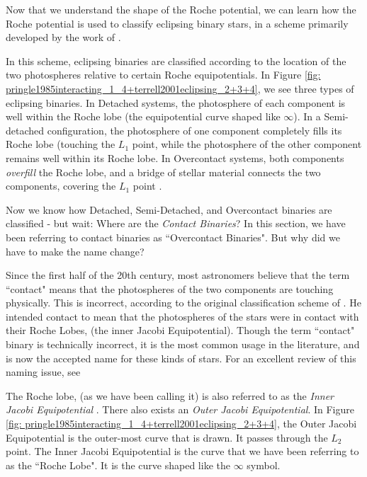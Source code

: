 \documentclass[12pt]{article} %
\numberwithin{equation}{section} %
\begin{document}
Now that we understand the shape of the Roche potential, we can learn how the Roche potential is used to classify eclipsing binary stars, in a scheme primarily developed by the work of \citet{kopal1959close}.

In this scheme, eclipsing binaries are classified according to the location of the two photospheres relative to certain Roche equipotentials. In Figure \ref{fig: pringle1985interacting_1_4+terrell2001eclipsing_2+3+4}, we see three types of eclipsing binaries. In Detached systems, the photosphere of each component is well within the Roche lobe (the equipotential curve shaped like $\infty$). In a Semi-detached configuration, the photosphere of one component completely fills its Roche lobe (touching the $L_{1}$ point, while the photosphere of the other component remains well within its Roche lobe. In Overcontact systems, both components \emph{overfill} the Roche lobe, and a bridge of stellar material connects the two components, covering the $L_{1}$ point \citep{terrell2001eclipsing}.

Now we know how Detached, Semi-Detached, and Overcontact binaries are classified - but wait: Where are the \emph{Contact Binaries}? In this section, we have been referring to contact binaries as ``Overcontact Binaries". But why did we have to make the name change?

Since the first half of the 20th century, most astronomers believe that the term ``contact" means that the photospheres of the two components are touching physically. This is incorrect, according to the original classification scheme of \citet{kopal1959close}. He intended contact to mean that the photospheres of the stars were in contact with their Roche Lobes, (the inner Jacobi Equipotential). Though the term ``contact" binary is technically incorrect, it is the most common usage in the literature, and is now the accepted name for these kinds of stars. For an excellent review of this naming issue, see \citet{wilson2001binary}

The Roche lobe, (as we have been calling it) is also referred to as the \emph{Inner Jacobi Equipotential} . There also exists an \emph{Outer Jacobi Equipotential}. In Figure \ref{fig: pringle1985interacting_1_4+terrell2001eclipsing_2+3+4}, the Outer Jacobi Equipotential is the outer-most curve that is drawn. It passes through the $L_{2}$ point. The Inner Jacobi Equipotential is the curve that we have been referring to as the ``Roche Lobe". It is the curve shaped like the $\infty$ symbol.
\end{document}
